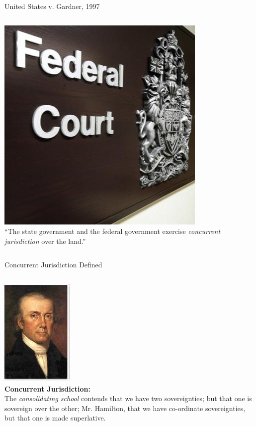 \begin{frame}{United States v. Gardner, 1997}
    \begin{columns}[c]
            \centering
            \includegraphics[height=0.4\textheight]{img/federal-court.png} \\
        \column{0.5\textheight}
            ``The state government and the federal government exercise \emph{concurrent jurisdiction} over the land.''
    \end{columns}
\end{frame}

\begin{frame}{Concurrent Jurisdiction Defined}
    \begin{columns}[c]
            \centering
            \includegraphics[height=0.4\textheight]{img/john-taylor-of-caroline.png} \\
        \column{0.5\textheight}
            \textbf{Concurrent Jurisdiction:} \\
            The \emph{consolidating school} contends that we have two
            sovereignties; but that one is sovereign over the other; Mr.
            Hamilton, that we have co-ordinate sovereignties, but that one is
            made superlative.
    \end{columns}
\end{frame}

